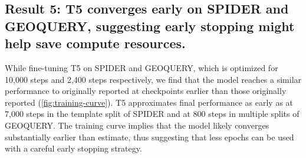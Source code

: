 \subsection{Result 5: T5 converges early on SPIDER and GEOQUERY, suggesting early stopping might help save compute resources.}
\label{sec:res:converge}


While fine-tuning T5 on SPIDER and GEOQUERY, which is optimized for 10,000 steps and 2,400 steps respectively, we find that the model reaches a similar performance to originally reported at checkpoints earlier than those originally reported (\cref{fig:training-curve}). 
T5 approximates final performance as early as at 7,000 steps in the template split of SPIDER and at 800 steps in multiple splits of GEOQUERY.
The training curve implies that the model likely converges substantially earlier than \citet{shaw-etal-2021-compositional} estimate, thus suggesting that less epochs can be used with a careful early stopping strategy.

